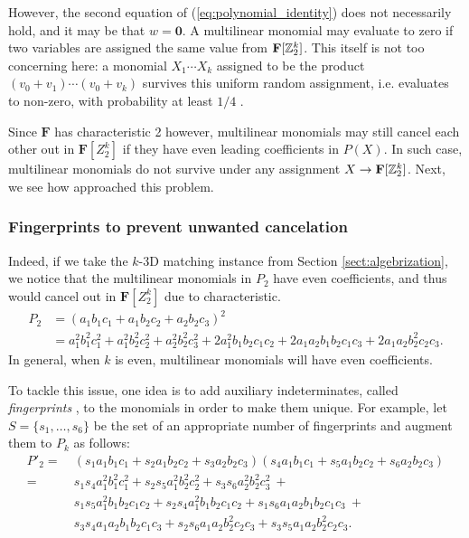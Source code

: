 However, the second equation of (\ref{eq:polynomial_identity}) 
does not necessarily hold, and it may be that $w = \mathbf{0}$. 
A multilinear monomial may evaluate to zero if two variables  
are assigned the same value from $\mathbf{F}[\mathbb Z_2^k]$. 
This itself is not too concerning here: 
a monomial $X_1 \cdots X_k$ assigned to be the product 
$(v_0 + v_1) \cdots (v_0 + v_k)$ survives this uniform random assignment, i.e. 
evaluates to non-zero, with probability at least $1/4$ \cite{Koutis08}.

Since $\mathbf{F}$ has characteristic 2 however, 
multilinear monomials may still cancel each other out 
in $\mathbf{F}[Z_2^k]$ if they have even leading 
coefficients in $P(X)$. In such case, multilinear monomials do not 
survive under any assignment $X \to \mathbf{F}[\mathbb Z_2^k]$. 
Next, we see how \citeauthor{Koutis08} approached this problem.

\subsubsection{Fingerprints to prevent unwanted cancelation}
\label{sect:fingerprints}

Indeed, if we take the $k$-3D matching instance from Section \ref{sect:algebrization}, 
we notice that the multilinear monomials in $P_2$ have even coefficients, and thus 
would cancel out in $\mathbf{F}[Z_2^k]$ due to characteristic.
\begin{align*}
  P_2 &= (a_1b_1c_1 + a_1b_2c_2 + a_2b_2c_3)^2  \\
  &= a_1^2b_1^2c_1^2 + a_1^2b_2^2c_2^2 + a_2^2b_2^2c_3^2 + 
  2a_1^2b_1b_2c_1c_2 + 2a_1a_2b_1b_2c_1c_3 + 2 a_1a_2b_2^2c_2c_3. 
\end{align*}
In general, when $k$ is even, multilinear monomials will have even coefficients. 

To tackle this issue, one idea is to add auxiliary indeterminates, 
called \emph{fingerprints} \cite{KouWil15}, to the monomials 
in order to make them unique. For example, let $S = \{s_1, \ldots, s_6\}$ 
be the set of an appropriate number of fingerprints 
and augment them to $P_k$ as follows: 
\begin{align*}
  P'_2 = &\:(s_1a_1b_1c_1 + s_2a_1b_2c_2 + s_3a_2b_2c_3)(s_4a_1b_1c_1 + s_5a_1b_2c_2 + s_6a_2b_2c_3) \\
  = &\:s_1s_4a_1^2b_1^2c_1^2 + s_2s_5a_1^2b_2^2c_2^2 + s_3s_6a_2^2b_2^2c_3^2 \:+ \\
  &\:s_1s_5a_1^2b_1b_2c_1c_2 + s_2s_4a_1^2b_1b_2c_1c_2 + s_1s_6a_1a_2b_1b_2c_1c_3 \:+ \\
  &\:s_3s_4a_1a_2b_1b_2c_1c_3 + s_2s_6a_1a_2b_2^2c_2c_3 + s_3s_5a_1a_2b_2^2c_2c_3. 
\end{align*}

